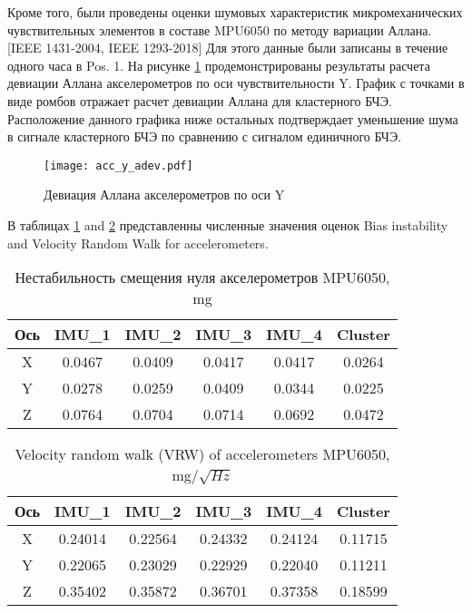 Кроме того, были проведены оценки шумовых характеристик микромеханических чувствительных элементов в составе MPU6050 по методу вариации Аллана. [IEEE 1431-2004, IEEE 1293-2018]
Для этого данные были записаны в течение одного часа в Pos. 1. На рисунке \ref{fig:acc_y_allan} продемонстрированы результаты расчета девиации Аллана акселерометров по оси чувствительности Y.
График с точками в виде ромбов отражает расчет девиации Аллана для кластерного БЧЭ. Расположение данного графика ниже остальных подтверждает уменьшение шума в сигнале кластерного БЧЭ 
по сравнению с сигналом единичного БЧЭ.

\begin{figure}[h!]
	\centering
	\texttt{[image: acc\_y\_adev.pdf]}
	\caption{Девиация Аллана акселерометров по оси Y}
	\label{fig:acc_y_allan}
\end{figure}

В таблицах \ref{table:acc_bias} and \ref{table:acc_vrw} представленны численные значения оценок Bias instability and Velocity Random Walk for accelerometers.

\begin{table}[h!]
	\centering
	\caption{Нестабильность смещения нуля акселерометров MPU6050, mg}
	\begin{tabular}{| c | c | c | c | c | c |}
	\hline
	Ось & IMU\_1 & IMU\_2 & IMU\_3 & IMU\_4 & Cluster \\ \hline
	X & 0.0467 & 0.0409 & 0.0417 & 0.0417 & 0.0264 \\ \hline
	Y & 0.0278 & 0.0259 & 0.0409 & 0.0344 & 0.0225 \\ \hline
	Z & 0.0764 & 0.0704 & 0.0714 & 0.0692 & 0.0472 \\
	\hline
	\end{tabular}
	\label{table:acc_bias}
\end{table}

\begin{table}[h!]
	\centering
	\caption{Velocity random walk (VRW) of accelerometers MPU6050, mg/$\sqrt{Hz}$}
	\begin{tabular}{| c | c | c | c | c | c |}
	\hline
	Ось & IMU\_1 & IMU\_2 & IMU\_3 & IMU\_4 & Cluster \\ \hline
	X & 0.24014 & 0.22564 & 0.24332 & 0.24124 & 0.11715 \\ \hline
	Y & 0.22065 & 0.23029 & 0.22929 & 0.22040 & 0.11211 \\ \hline
	Z & 0.35402 & 0.35872 & 0.36701 & 0.37358 & 0.18599 \\
	\hline
	\end{tabular}
	\label{table:acc_vrw}
\end{table}

